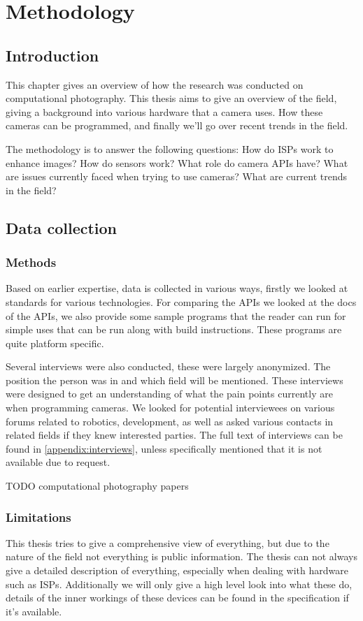 \chapter{Methodology}
\section{Introduction}
This chapter gives an overview of how the research was conducted on
computational photography. This thesis aims to give an overview of the field,
giving a background into various hardware that a camera uses. How these
cameras can be programmed, and finally we'll go over recent trends in the
field.

The methodology is to answer the following questions: How do ISPs work to
enhance images? How do sensors work? What role do camera APIs have? What
are issues currently faced when trying to use cameras? What are current trends
in the field?

\section{Data collection}
\subsection{Methods}
Based on earlier expertise, data is collected in various ways, firstly we
looked at standards for various technologies. For comparing the APIs we looked
at the docs of the APIs, we also provide some sample programs that the reader
can run for simple uses that can be run along with build instructions. These
programs are quite platform specific.

Several interviews were also conducted, these were largely anonymized. The
position the person was in and which field will be mentioned. These interviews
were designed to get an understanding of what the pain points currently are
when programming cameras. We looked for potential interviewees on various
forums related to robotics, development, as well as asked various contacts in
related fields if they knew interested parties. The full text of interviews can
be found in \cref{appendix:interviews}, unless specifically mentioned that it
is not available due to request.

TODO computational photography papers

\subsection{Limitations}
This thesis tries to give a comprehensive view of everything, but due to the
nature of the field not everything is public information. The thesis can not
always give a detailed description of everything, especially when dealing with
hardware such as ISPs. Additionally we will only give a high level look into
what these do, details of the inner workings of these devices can be found in
the specification if it's available.

